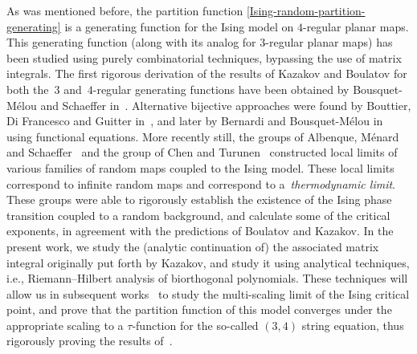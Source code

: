 \documentclass[pdftex]{sigma}
\numberwithin{equation}{section}
\begin{document}
As was mentioned before, the partition function \eqref{Ising-random-partition-generating} is a generating function for the Ising model on $4$-regular planar maps. This
generating function (along with its analog for $3$-regular planar maps) has been studied using purely combinatorial techniques, bypassing the use of
matrix integrals. The first rigorous derivation of the results of Kazakov and Boulatov for
both the~$3$ and~$4$-regular generating functions have been obtained by Bousquet-M\'{e}lou and Schaeffer in~\cite{MelouSchaeffer}. Alternative bijective approaches were found by Bouttier, Di Francesco and Guitter in~\cite{BFG,BDFG}, and later by Bernardi and Bousquet-M\'{e}lou in~\cite{BBM} using functional equations. More recently still, the groups of Albenque, M\'{e}nard and Schaeffer~\cite{AM22, AMS} and the group of
Chen and Turunen~\cite{CT1,CT2,Tur} constructed local limits of various families of random maps coupled to the Ising model. These local limits correspond to infinite random maps and correspond to a~\textit{thermodynamic limit}. These groups were able to rigorously establish the existence of
the Ising phase transition coupled to a random background, and calculate some of the critical exponents, in agreement with the predictions of Boulatov and Kazakov. In the present work, we study the (analytic continuation of) the associated matrix integral originally put forth by Kazakov, and study it using analytical techniques, i.e., Riemann--Hilbert analysis of biorthogonal polynomials. These techniques will allow us in subsequent works~\cite{DHL3, DHL2} to study the multi-scaling limit of the Ising critical point, and prove that the partition function of this model converges under the appropriate scaling to a $\tau$-function for the so-called $(3,4)$ string equation, thus rigorously proving the results of~\cite{Kazakov3,CGM}.
\end{document}
